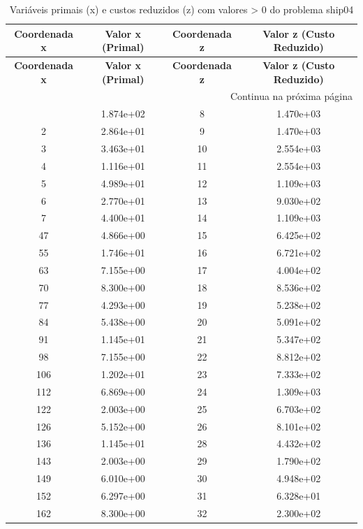 \documentclass[12pt]{article}
\begin{document}
\begin{longtable}{@{}cccc@{}}
\caption{Variáveis primais (x) e custos reduzidos (z) com valores > 0 do problema ship04} \\
\toprule
\textbf{Coordenada x} & \textbf{Valor x (Primal)} & \textbf{Coordenada z} & \textbf{Valor z (Custo Reduzido)} \\
\midrule
\endfirsthead

\toprule
\textbf{Coordenada x} & \textbf{Valor x (Primal)} & \textbf{Coordenada z} & \textbf{Valor z (Custo Reduzido)} \\
\midrule
\endhead

\midrule \multicolumn{4}{r}{{Continua na próxima página}} \\ \midrule
\endfoot

\bottomrule
\endlastfoot
1 & 1.874e+02 & 8 & 1.470e+03 \\
2 & 2.864e+01 & 9 & 1.470e+03 \\
3 & 3.463e+01 & 10 & 2.554e+03 \\
4 & 1.116e+01 & 11 & 2.554e+03 \\
5 & 4.989e+01 & 12 & 1.109e+03 \\
6 & 2.770e+01 & 13 & 9.030e+02 \\
7 & 4.400e+01 & 14 & 1.109e+03 \\
47 & 4.866e+00 & 15 & 6.425e+02 \\
55 & 1.746e+01 & 16 & 6.721e+02 \\
63 & 7.155e+00 & 17 & 4.004e+02 \\
70 & 8.300e+00 & 18 & 8.536e+02 \\
77 & 4.293e+00 & 19 & 5.238e+02 \\
84 & 5.438e+00 & 20 & 5.091e+02 \\
91 & 1.145e+01 & 21 & 5.347e+02 \\
98 & 7.155e+00 & 22 & 8.812e+02 \\
106 & 1.202e+01 & 23 & 7.333e+02 \\
112 & 6.869e+00 & 24 & 1.309e+03 \\
122 & 2.003e+00 & 25 & 6.703e+02 \\
126 & 5.152e+00 & 26 & 8.101e+02 \\
136 & 1.145e+01 & 28 & 4.432e+02 \\
143 & 2.003e+00 & 29 & 1.790e+02 \\
149 & 6.010e+00 & 30 & 4.948e+02 \\
152 & 6.297e+00 & 31 & 6.328e+01 \\
162 & 8.300e+00 & 32 & 2.300e+02 \\

\end{longtable}
\end{document}
